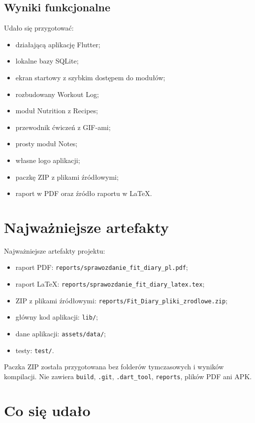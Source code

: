 \documentclass[12pt,a4paper]{article}
\begin{document}
\subsection{Wyniki funkcjonalne}

Udało się przygotować:

\begin{itemize}
    \item działającą aplikację Flutter;
    \item lokalne bazy SQLite;
    \item ekran startowy z szybkim dostępem do modułów;
    \item rozbudowany Workout Log;
    \item moduł Nutrition z Recipes;
    \item przewodnik ćwiczeń z GIF-ami;
    \item prosty moduł Notes;
    \item własne logo aplikacji;
    \item paczkę ZIP z plikami źródłowymi;
    \item raport w PDF oraz źródło raportu w \LaTeX.
\end{itemize}

\section{Najważniejsze artefakty}

Najważniejsze artefakty projektu:

\begin{itemize}
    \item raport PDF: \texttt{reports/sprawozdanie\_fit\_diary\_pl.pdf};
    \item raport \LaTeX: \texttt{reports/sprawozdanie\_fit\_diary\_latex.tex};
    \item ZIP z plikami źródłowymi: \texttt{reports/Fit\_Diary\_pliki\_zrodlowe.zip};
    \item główny kod aplikacji: \texttt{lib/};
    \item dane aplikacji: \texttt{assets/data/};
    \item testy: \texttt{test/}.
\end{itemize}

Paczka ZIP została przygotowana bez folderów tymczasowych i wyników kompilacji. Nie zawiera \texttt{build}, \texttt{.git}, \texttt{.dart\_tool}, \texttt{reports}, plików PDF ani APK.

\section{Co się udało}
\end{document}
